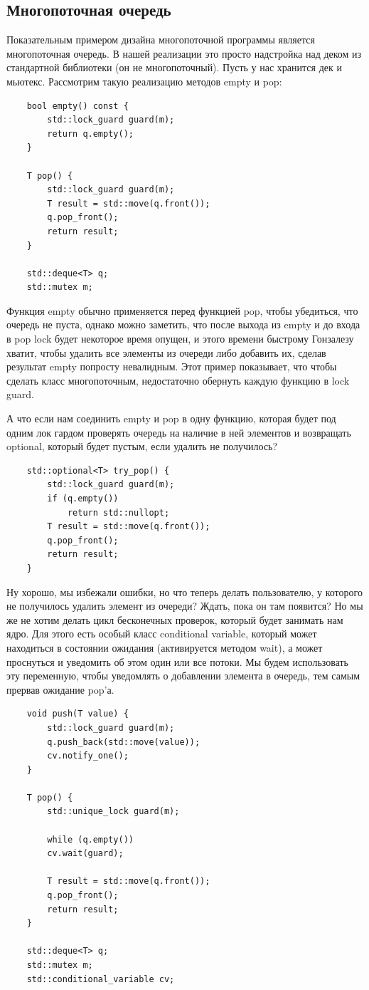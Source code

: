 \documentclass[12pt, a4paper]{article}
\begin{document}
\subsection{Многопоточная очередь}
Показательным примером дизайна многопоточной программы является многопоточная очередь. В нашей реализации это просто надстройка над деком из стандартной библиотеки (он не многопоточный). Пусть у нас хранится дек и мьютекс. Рассмотрим такую реализацию методов empty и pop:
\begin{verbatim}
	bool empty() const {
		std::lock_guard guard(m);
		return q.empty();
	}
	
	T pop() {
		std::lock_guard guard(m);
		T result = std::move(q.front());
		q.pop_front();
		return result;
	}
	
	std::deque<T> q;
	std::mutex m;
\end{verbatim}
Функция empty обычно применяется перед функцией pop, чтобы убедиться, что очередь не пуста, однако можно заметить, что после выхода из empty и до входа в pop lock будет некоторое время опущен, и этого времени быстрому Гонзалезу хватит, чтобы удалить все элементы из очереди либо добавить их, сделав результат empty попросту невалидным. Этот пример показывает, что чтобы сделать класс многопоточным, недостаточно обернуть каждую функцию в lock guard.\par
А что если нам соединить empty и pop в одну функцию, которая будет под одним лок гардом проверять очередь на наличие в ней элементов и возвращать optional, который будет пустым, если удалить не получилось?
\begin{verbatim}
	std::optional<T> try_pop() {
		std::lock_guard guard(m);
		if (q.empty())
			return std::nullopt;
		T result = std::move(q.front());
		q.pop_front();
		return result;
	}   
\end{verbatim}
Ну хорошо, мы избежали ошибки, но что теперь делать пользователю, у которого не получилось удалить элемент из очереди? Ждать, пока он там появится? Но мы же не хотим делать цикл бесконечных проверок, который будет занимать нам ядро. Для этого есть особый класс conditional variable, который может находиться в состоянии ожидания (активируется методом wait), а может проснуться и уведомить об этом один или все потоки. Мы будем использовать эту переменную, чтобы уведомлять о добавлении элемента в очередь, тем самым прервав ожидание pop'а.
\begin{verbatim}
	void push(T value) {
		std::lock_guard guard(m);
		q.push_back(std::move(value));
		cv.notify_one();
	}
	
	T pop() {
		std::unique_lock guard(m);
		
		while (q.empty())
		cv.wait(guard);
		
		T result = std::move(q.front());
		q.pop_front();
		return result;
	}
	
	std::deque<T> q;
	std::mutex m;
	std::conditional_variable cv;
\end{verbatim}
\end{document}
